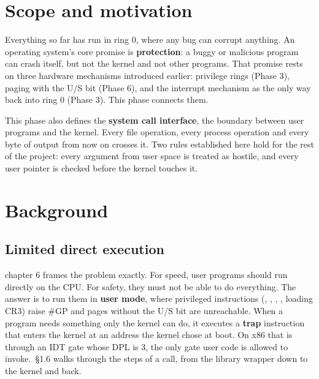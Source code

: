 \documentclass[11pt,a4paper]{article}
\begin{document}


\section{Scope and motivation}

Everything so far has run in ring 0, where any bug can corrupt anything. An operating system's core promise is
\textbf{protection}: a buggy or malicious program can crash itself, but not the kernel and not other programs. That
promise rests on three hardware mechanisms introduced earlier: privilege rings (Phase 3), paging with the U/S bit
(Phase 6), and the interrupt mechanism as the only way back into ring 0 (Phase 3). This phase connects them.

This phase also defines the \textbf{system call interface}, the boundary between user programs and the kernel. Every
file operation, every process operation and every byte of output from now on crosses it. Two rules established here
hold for the rest of the project: every argument from user space is treated as hostile, and every user pointer
is checked before the kernel touches it.

\section{Background}

\subsection{Limited direct execution}

\OSTEP chapter 6 frames the problem exactly. For speed, user programs should run directly on the CPU. For safety, they
must not be able to do everything. The answer is to run them in \textbf{user mode}, where privileged instructions
(, , , , loading CR3) raise \#GP and pages without the U/S bit are
unreachable. When a program needs something only the kernel can do, it executes a \textbf{trap} instruction that
enters the kernel at an address the kernel chose at boot. On x86 that is  through an IDT gate whose DPL
is 3, the only gate user code is allowed to invoke. \MOS\,\S1.6 walks through the steps of a  call, from
the library wrapper down to the kernel and back.
\end{document}
